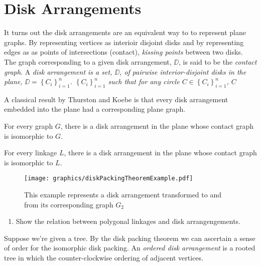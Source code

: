 \section{Disk Arrangements}
It turns out the disk arrangements are an equivalent way to to represent plane graphs.  By 
representing vertices as interioir disjoint disks and by representing edges as as points of 
intersections (contact), \textit{kissing 
points} between two disks.  The graph corresponding to a given disk arrangement, $\DD$, is said to 
be the \textit{contact graph}. A \it{disk arrangement} is a set, $\DD$, of pairwise 
interior-disjoint disks in the plane, 
$\DD=\left\lbrace C_i \right\rbrace_{i = 1}^n $.
$\left\lbrace C_i \right\rbrace_{i = 1}^n $ such that for any circle $C \in \left\lbrace C_i 
\right\rbrace_{i = 1}^n$, $C$


A classical result by Thurston and Koebe is that every disk arrangement embedded into the plane had 
a corresponding plane graph.
\begin{thm}\label{thm2-1}
For every graph $G$, there is a disk arrangement in the
plane whose contact graph is isomorphic to $G$.
\end{thm}

\begin{prop}
 For every linkage $L$, there is a disk arrangement in the
plane whose contact graph is isomorphic to $L$.
\end{prop}


\begin{figure}[h]
\begin{center}
\texttt{[image: graphics/diskPackingTheoremExample.pdf]}
\end{center} 
\caption{This example represents a disk arrangement transformed to and from its corresponding graph 
$G_2$}
\label{fig:DiskArrangement-1}
\end{figure}
\begin{enumerate}%
\item Show the relation between polygonal linkages and disk arrangengements.
\end{enumerate} 
Suppose we're given a tree. By the disk packing theorem we can ascertain a sense of order for the 
isomorphic disk packing.  An \textit{ordered disk arrangement} is a rooted tree in which the 
counter-clockwise ordering of adjacent vertices.


